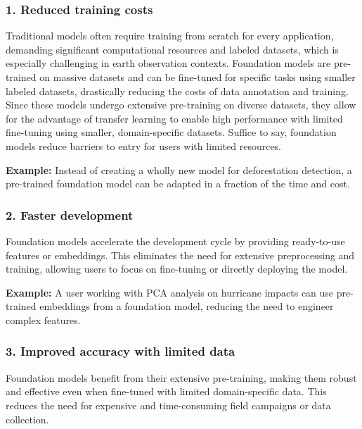 \documentclass[
  letterpaper,
  DIV=11,
  numbers=noendperiod]{scrreprt}
\begin{document}
\subsubsection{\texorpdfstring{\textbf{1. Reduced training
costs}}{1. Reduced training costs}}\label{reduced-training-costs}

Traditional models often require training from scratch for every
application, demanding significant computational resources and labeled
datasets, which is especially challenging in earth observation contexts.
Foundation models are pre-trained on massive datasets and can be
fine-tuned for specific tasks using smaller labeled datasets,
drastically reducing the costs of data annotation and training. Since
these models undergo extensive pre-training on diverse datasets, they
allow for the advantage of transfer learning to enable high performance
with limited fine-tuning using smaller, domain-specific datasets.
Suffice to say, foundation models reduce barriers to entry for users
with limited resources.

\textbf{Example:} Instead of creating a wholly new model for
deforestation detection, a pre-trained foundation model can be adapted
in a fraction of the time and cost.

\subsubsection{\texorpdfstring{\textbf{2. Faster
development}}{2. Faster development}}\label{faster-development}

Foundation models accelerate the development cycle by providing
ready-to-use features or embeddings. This eliminates the need for
extensive preprocessing and training, allowing users to focus on
fine-tuning or directly deploying the model.

\textbf{Example:} A user working with PCA analysis on hurricane impacts
can use pre-trained embeddings from a foundation model, reducing the
need to engineer complex features.

\subsubsection{\texorpdfstring{\textbf{3. Improved accuracy with limited
data}}{3. Improved accuracy with limited data}}\label{improved-accuracy-with-limited-data}

Foundation models benefit from their extensive pre-training, making them
robust and effective even when fine-tuned with limited domain-specific
data. This reduces the need for expensive and time-consuming field
campaigns or data collection.
\end{document}
